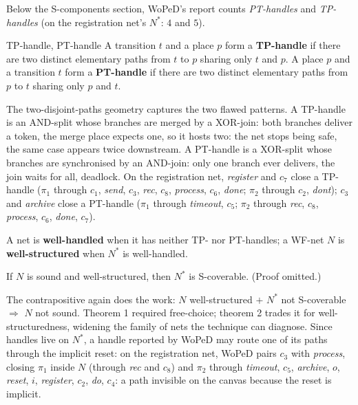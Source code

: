 Below the S-components section, WoPeD's report counts \emph{PT-handles} and \emph{TP-handles} (on the registration net's $N^{*}$: $4$ and $5$).
\begin{definitionbox}{TP-handle, PT-handle}
A transition $t$ and a place $p$ form a \textbf{TP-handle} if there are two distinct elementary paths from $t$ to $p$ sharing only $t$ and $p$. A place $p$ and a transition $t$ form a \textbf{PT-handle} if there are two distinct elementary paths from $p$ to $t$ sharing only $p$ and $t$.
\end{definitionbox}
The two-disjoint-paths geometry captures the two flawed patterns. A TP-handle is an AND-split whose branches are merged by a XOR-join: both branches deliver a token, the merge place expects one, so it hosts two: the net stops being safe, the same case appears twice downstream. A PT-handle is a XOR-split whose branches are synchronised by an AND-join: only one branch ever delivers, the join waits for all, deadlock. On the registration net, \emph{register} and $c_7$ close a TP-handle ($\pi_1$ through $c_1$, \emph{send}, $c_3$, \emph{rec}, $c_8$, \emph{process}, $c_6$, \emph{done}; $\pi_2$ through $c_2$, \emph{dont}); $c_3$ and \emph{archive} close a PT-handle ($\pi_1$ through \emph{timeout}, $c_5$; $\pi_2$ through \emph{rec}, $c_8$, \emph{process}, $c_6$, \emph{done}, $c_7$).
\begin{definition}
A net is \textbf{well-handled} when it has neither TP- nor PT-handles; a WF-net $N$ is \textbf{well-structured} when $N^{*}$ is well-handled.
\end{definition}

\begin{theorem}[S-coverability, 2]
If $N$ is sound and well-structured, then $N^{*}$ is S-coverable. (Proof omitted.)
\end{theorem}
The contrapositive again does the work: $N$ well-structured $+$ $N^{*}$ not S-coverable $\Rightarrow$ $N$ not sound. Theorem 1 required free-choice; theorem 2 trades it for well-structuredness, widening the family of nets the technique can diagnose. Since handles live on $N^{*}$, a handle reported by WoPeD may route one of its paths through the implicit reset: on the registration net, WoPeD pairs $c_3$ with \emph{process}, closing $\pi_1$ inside $N$ (through \emph{rec} and $c_8$) and $\pi_2$ through \emph{timeout}, $c_5$, \emph{archive}, $o$, \emph{reset}, $i$, \emph{register}, $c_2$, \emph{do}, $c_4$: a path invisible on the canvas because the reset is implicit.

